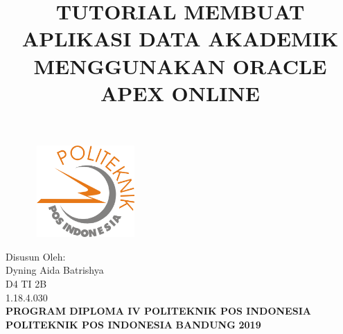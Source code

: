 \documentclass[a4paper, 12pt]{article}
\begin{document}
\title{\textbf{TUTORIAL MEMBUAT APLIKASI DATA AKADEMIK MENGGUNAKAN ORACLE APEX ONLINE}}
\date{}

\maketitle

\begin{figure}[!ht]
\begin{center}
\includegraphics[width = 4cm, height = 3.5cm]{figures/logo.png}
\end{center}
\end{figure}

\begin{center}
\vspace{1cm}
Disusun Oleh:\\
Dyning Aida Batrishya\\
D4 TI 2B\\
1.18.4.030\\
\vspace{1cm}
\textbf{PROGRAM DIPLOMA IV POLITEKNIK POS INDONESIA} \linebreak
\textbf{POLITEKNIK POS INDONESIA} \linebreak
\textbf{BANDUNG}\linebreak
\textbf{2019}

\end{center}

\thispagestyle{empty}


\end{document}
